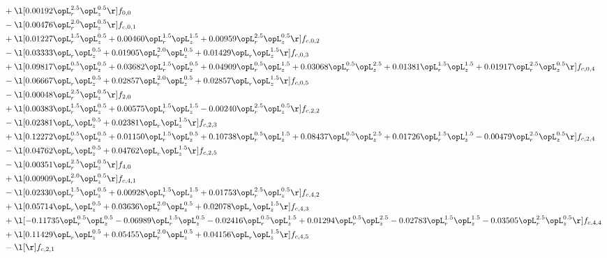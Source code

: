 \begin{alignat}{2}
& + \l[  0.00192 \opL_r^{2.5} \opL_z^{0.5}  \r] f_{0,0} \nonumber \\ 
& - \l[  0.00476 \opL_r^{2.0} \opL_z^{0.5}  \r] f_{c,0,1} \nonumber \\ 
& + \l[  0.01227 \opL_r^{1.5} \opL_z^{0.5} +  0.00460 \opL_r^{1.5} \opL_z^{1.5} +  0.00959 \opL_r^{2.5} \opL_z^{0.5}  \r] f_{c,0,2} \nonumber \\ 
& - \l[  0.03333 \opL_r \opL_z^{0.5} +  0.01905 \opL_r^{2.0} \opL_z^{0.5} +  0.01429 \opL_r \opL_z^{1.5}  \r] f_{c,0,3} \nonumber \\ 
& + \l[  0.09817 \opL_r^{0.5} \opL_z^{0.5} +  0.03682 \opL_r^{1.5} \opL_z^{0.5} +  0.04909 \opL_r^{0.5} \opL_z^{1.5} +  0.03068 \opL_r^{0.5} \opL_z^{2.5} +  0.01381 \opL_r^{1.5} \opL_z^{1.5} +  0.01917 \opL_r^{2.5} \opL_z^{0.5}  \r] f_{c,0,4} \nonumber \\ 
& - \l[  0.06667 \opL_r \opL_z^{0.5} +  0.02857 \opL_r^{2.0} \opL_z^{0.5} +  0.02857 \opL_r \opL_z^{1.5}  \r] f_{c,0,5} \nonumber \\ 
& - \l[  0.00048 \opL_r^{2.5} \opL_z^{0.5}  \r] f_{2,0} \nonumber \\ 
& + \l[  0.00383 \opL_r^{1.5} \opL_z^{0.5} +  0.00575 \opL_r^{1.5} \opL_z^{1.5}   -0.00240 \opL_r^{2.5} \opL_z^{0.5}  \r] f_{c,2,2} \nonumber \\ 
& - \l[  0.02381 \opL_r \opL_z^{0.5} +  0.02381 \opL_r \opL_z^{1.5}  \r] f_{c,2,3} \nonumber \\ 
& + \l[  0.12272 \opL_r^{0.5} \opL_z^{0.5} +  0.01150 \opL_r^{1.5} \opL_z^{0.5} +  0.10738 \opL_r^{0.5} \opL_z^{1.5} +  0.08437 \opL_r^{0.5} \opL_z^{2.5} +  0.01726 \opL_r^{1.5} \opL_z^{1.5}   -0.00479 \opL_r^{2.5} \opL_z^{0.5}  \r] f_{c,2,4} \nonumber \\ 
& - \l[  0.04762 \opL_r \opL_z^{0.5} +  0.04762 \opL_r \opL_z^{1.5}  \r] f_{c,2,5} \nonumber \\ 
& - \l[  0.00351 \opL_r^{2.5} \opL_z^{0.5}  \r] f_{4,0} \nonumber \\ 
& + \l[  0.00909 \opL_r^{2.0} \opL_z^{0.5}  \r] f_{c,4,1} \nonumber \\ 
& - \l[  0.02330 \opL_r^{1.5} \opL_z^{0.5} +  0.00928 \opL_r^{1.5} \opL_z^{1.5} +  0.01753 \opL_r^{2.5} \opL_z^{0.5}  \r] f_{c,4,2} \nonumber \\ 
& + \l[  0.05714 \opL_r \opL_z^{0.5} +  0.03636 \opL_r^{2.0} \opL_z^{0.5} +  0.02078 \opL_r \opL_z^{1.5}  \r] f_{c,4,3} \nonumber \\ 
& + \l[  -0.11735 \opL_r^{0.5} \opL_z^{0.5}   -0.06989 \opL_r^{1.5} \opL_z^{0.5}   -0.02416 \opL_r^{0.5} \opL_z^{1.5} +  0.01294 \opL_r^{0.5} \opL_z^{2.5}   -0.02783 \opL_r^{1.5} \opL_z^{1.5}   -0.03505 \opL_r^{2.5} \opL_z^{0.5}  \r] f_{c,4,4} \nonumber \\ 
& + \l[  0.11429 \opL_r \opL_z^{0.5} +  0.05455 \opL_r^{2.0} \opL_z^{0.5} +  0.04156 \opL_r \opL_z^{1.5}  \r] f_{c,4,5} \nonumber \\ 
& - \l[  \r] f_{c,2,1} \nonumber \\ 
\end{alignat} 


